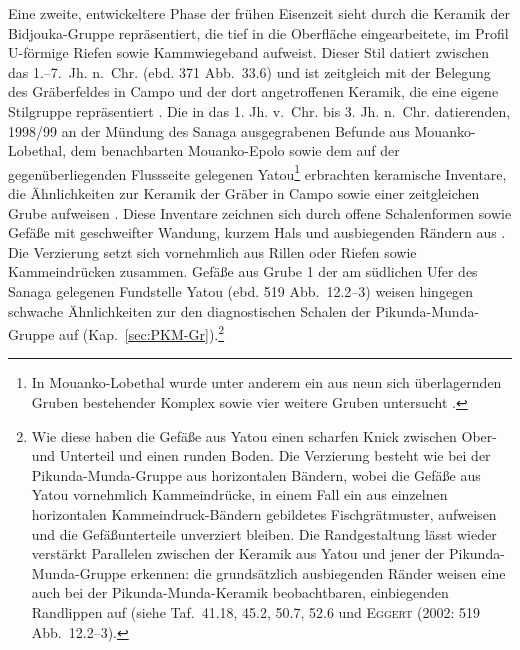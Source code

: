 Eine zweite, entwickeltere Phase der frühen Eisenzeit sieht \textcite[363--369, 368 Abb.~30.6]{GouemGouem.20102011} durch die Keramik der Bidjouka-Gruppe repräsentiert, die tief in die Oberfläche eingearbeitete, im Profil U-förmige Riefen sowie Kammwiegeband aufweist. Dieser Stil datiert zwischen das 1.--7.~Jh. n.~Chr. (ebd. 371 Abb.~33.6) und ist zeitgleich mit der Belegung des Gräberfeldes in Campo und der dort angetroffenen Keramik, die eine eigene Stilgruppe repräsentiert \parencite[98 Abb.~5.6]{Eggert.2016}. Die in das 1. Jh. v.~Chr. bis 3. Jh. n.~Chr. datierenden, 1998/99 an der Mündung des Sanaga ausgegrabenen Befunde aus Mouanko-Lobethal, dem benachbarten Mouanko-Epolo sowie dem auf der gegenüberliegenden Flussseite gelegenen Yatou\footnote{In Mouanko-Lobethal wurde unter anderem ein aus neun sich überlagernden Gruben bestehender Komplex sowie vier weitere Gruben untersucht \parencite[513]{Eggert.2002}.} erbrachten keramische Inventare, die Ähnlichkeiten zur Keramik der Gräber in Campo \parencites[239 Abb.~2]{Meister.2010}[98 Abb.~5.6]{Eggert.2016} sowie einer zeitgleichen Grube aufweisen \parencite[161 Abb.~3.5--10]{Seidensticker.2010c}. Diese Inventare zeichnen sich durch offene Schalenformen sowie Gefäße mit geschweifter Wandung, kurzem Hals und ausbiegenden Rändern aus \parencite[514--519 Abb.~7--12; Abb.~\ref{fig:swCameroon_Sequence}.13--14]{Eggert.2002}. Die Verzierung setzt sich vornehmlich aus Rillen oder Riefen sowie Kammeindrücken zusammen. Gefäße aus Grube 1 der am südlichen Ufer des Sanaga gelegenen Fundstelle Yatou (ebd. 519 Abb.~12.2--3) weisen hingegen schwache Ähnlichkeiten zur den diagnostischen Schalen der Pikunda-Munda-Gruppe auf (Kap.~\ref{sec:PKM-Gr}).\footnote{Wie diese haben die Gefäße aus Yatou einen scharfen Knick zwischen Ober- und Unterteil und einen runden Boden. Die Verzierung besteht wie bei der Pikunda-Munda-Gruppe aus horizontalen Bändern, wobei die Gefäße aus Yatou vornehmlich Kammeindrücke, in einem Fall ein aus einzelnen horizontalen Kammeindruck-Bändern gebildetes Fischgrätmuster, aufweisen und die Gefäßunterteile unverziert bleiben. Die Randgestaltung lässt wieder verstärkt Parallelen zwischen der Keramik aus Yatou und jener der Pikunda-Munda-Gruppe erkennen: die grundsätzlich ausbiegenden Ränder weisen eine auch bei der Pikunda-Munda-Keramik beobachtbaren, einbiegenden Randlippen auf (siehe Taf.~41.18, 45.2, 50.7, 52.6 und \textsc{Eggert} (2002: 519 Abb.~12.2--3).}

